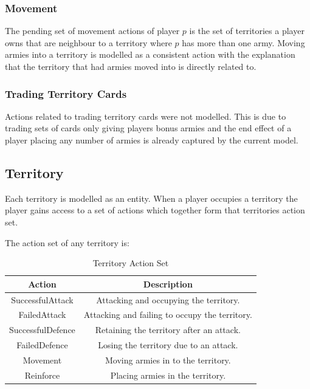 \documentclass[parskip]{cs4rep}
\begin{document}
\subsubsection{Movement}

The pending set of movement actions of player $p$ is the set of territories a player owns that are neighbour to a territory where $p$ has more than one army. Moving armies into a territory is modelled as a consistent action with the explanation that the territory that had armies moved into is directly related to.

\subsubsection{Trading Territory Cards}

Actions related to trading territory cards were not modelled. This is due to trading sets of cards only giving players bonus armies and the end effect of a player placing any number of armies is already captured by the current model.

\subsection{Territory}

Each territory is modelled as an entity. When a player occupies a territory the player gains access to a set of actions which together form that territories action set.

The action set of any territory is:

\begin{table}[ht]
\centering
\begin{tabular}{|c|c|}
\hline 
\textbf{Action} & \textbf{Description} \\ 
\hline 
SuccessfulAttack & Attacking and occupying the territory.\\ 
\hline 
FailedAttack & Attacking and failing to occupy the territory.\\ 
\hline 
SuccessfulDefence & Retaining the territory after an attack.\\ 
\hline 
FailedDefence & Losing the territory due to an attack.\\
\hline
Movement & Moving armies in to the territory.\\
\hline  
Reinforce & Placing armies in the territory.\\
\hline 
\end{tabular}
\caption{Territory Action Set}
\label{table:territory-actions-bonus}
\end{table}
\end{document}
